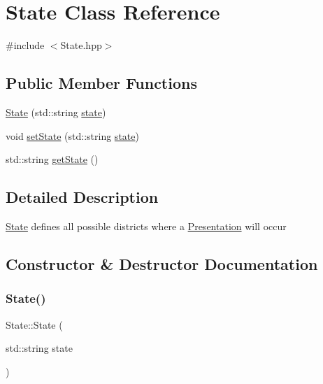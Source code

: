\hypertarget{class_state}{}\section{State Class Reference}
\label{class_state}


{\ttfamily \#include $<$State.\+hpp$>$}

\subsection*{Public Member Functions}
\begin{DoxyCompactItemize}
\item 
\mbox{\hyperlink{class_state_aeb74cd119de80264e758b143d65b19f5}{State}} (std\+::string \mbox{\hyperlink{states_8hpp_adc6e5733fc3c22f0a7b2914188c49c90}{state}})
\item 
void \mbox{\hyperlink{class_state_ad267a860927ae9032e808d06d5fc9d30}{set\+State}} (std\+::string \mbox{\hyperlink{states_8hpp_adc6e5733fc3c22f0a7b2914188c49c90}{state}})
\item 
std\+::string \mbox{\hyperlink{class_state_ad8697cb367f8b1453a1412426fc248ae}{get\+State}} ()
\end{DoxyCompactItemize}


\subsection{Detailed Description}
\mbox{\hyperlink{class_state}{State}} defines all possible districts where a \mbox{\hyperlink{class_presentation}{Presentation}} will occur 

\subsection{Constructor \& Destructor Documentation}
\mbox{\label{class_state_aeb74cd119de80264e758b143d65b19f5}} 
\subsubsection{\texorpdfstring{State()}{State()}}
{\footnotesize\ttfamily State\+::\+State (\begin{DoxyParamCaption}\item[{std\+::string}]{state }\end{DoxyParamCaption})}




